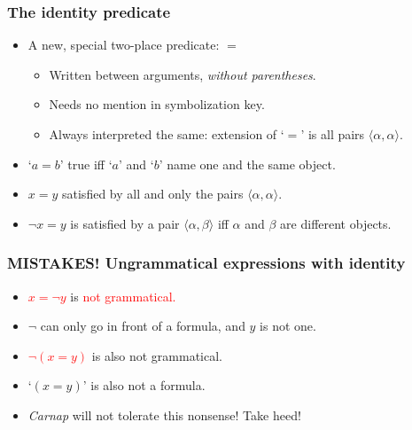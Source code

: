 \begin{frame}
  \frametitle{The identity predicate}

  \begin{itemize}[<+->]
    \item A new, special two-place predicate: \emph{$=$}
    \begin{itemize}[<+->]
      \item Written between arguments, \emph{without parentheses}.
      \item Needs no mention in symbolization key.
      \item Always interpreted the same: extension of `$=$' is all pairs $\langle\alpha, \alpha\rangle$.
    \end{itemize}
    \bigskip
    \item `$a=b$' true iff `$a$' and `$b$' name one and the same object.
    \item $x=y$ satisfied by all and only the pairs $\langle \alpha,\alpha\rangle$.
    \item $\lnot x=y$ is satisfied by a pair $\langle
    \alpha,\beta\rangle$ iff $\alpha$ and $\beta$ are different objects.
  \end{itemize}
\end{frame}

\begin{frame}
 \frametitle{MISTAKES! Ungrammatical expressions with identity}
  \begin{itemize}[<+->]
   \item \textcolor{red}{$x = \lnot y$} is \textcolor{red}{not grammatical.} 
   \item[] $\lnot$ can only go in front of a formula, and $y$ is not one.
    \item\textcolor{red}{$\lnot(x=y)$} is also not grammatical.
    \item[] `$(x=y)$' is also not a formula.
    \item \textit{Carnap} will not tolerate this nonsense! Take heed! 
   \end{itemize}
\end{frame}


